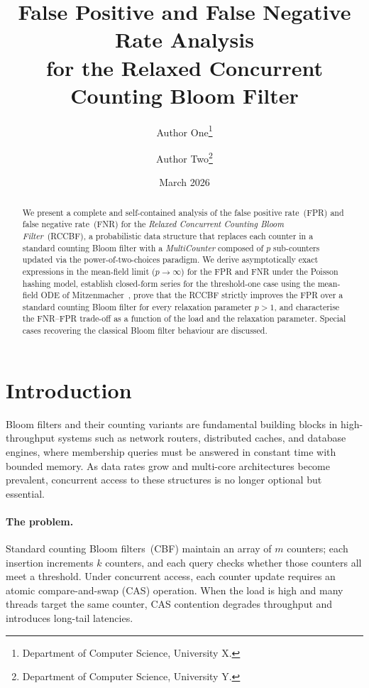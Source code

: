 \documentclass[11pt,a4paper]{article}
\title{%
  False Positive and False Negative Rate Analysis\\
  for the Relaxed Concurrent Counting Bloom Filter}
\author{%
  Author One\thanks{Department of Computer Science, University X.}
  \and
  Author Two\thanks{Department of Computer Science, University Y.}
}
\date{March 2026}
\newcommand{\CBF}{\textsf{CBF}}
\newcommand{\RCCBF}{\textsf{RCCBF}}
\begin{document}
\maketitle

\begin{abstract}
We present a complete and self-contained analysis of the false positive
rate~(FPR) and false negative rate~(FNR) for the \emph{Relaxed Concurrent
Counting Bloom Filter}~(\RCCBF{}), a probabilistic data structure that
replaces each counter in a standard counting Bloom filter with a
\emph{MultiCounter} composed of $p$ sub-counters updated via the
power-of-two-choices paradigm.  We derive asymptotically exact expressions
in the mean-field limit ($p\to\infty$) for the FPR and
FNR under the Poisson hashing model, establish closed-form series for the
threshold-one case using the mean-field ODE of Mitzenmacher~\cite{mitzenmacher1996},
prove that the \RCCBF{} strictly improves the FPR over a standard counting
Bloom filter for every relaxation parameter $p>1$, and characterise the
FNR--FPR trade-off as a function of the load and the relaxation parameter.
Special cases recovering the classical Bloom filter behaviour are discussed.
\end{abstract}

\section{Introduction}\label{sec:intro}

Bloom filters and their counting variants are fundamental building blocks
in high-throughput systems such as network routers, distributed caches,
and database engines, where membership queries must be answered in
constant time with bounded memory.  As data rates grow and multi-core
architectures become prevalent, concurrent access to these structures is
no longer optional but essential.

\paragraph{The problem.}
Standard counting Bloom filters~(\CBF{}) maintain an array of $m$
counters; each insertion increments $k$ counters, and each query checks
whether those counters all meet a threshold.  Under concurrent access,
each counter update requires an atomic compare-and-swap (CAS) operation.
When the load is high and many threads target the same counter, CAS
contention degrades throughput and introduces long-tail latencies.
\end{document}
